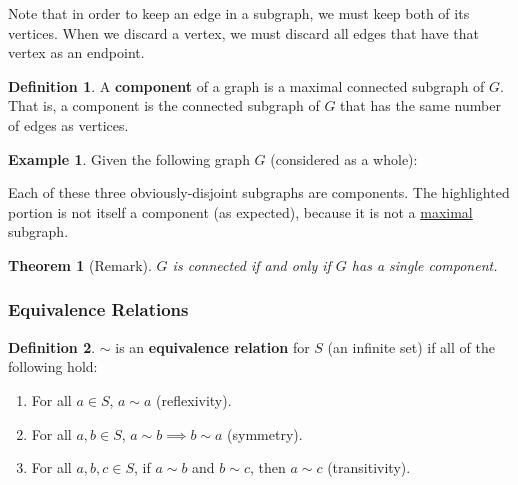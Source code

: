 \documentclass[]{article}
\newtheorem*{theorem}{Theorem}
\theoremstyle{definition}
\newtheorem*{defn}{Definition}
\newtheorem{ex}{Example}[section]
\begin{document}
				Note that in order to keep an edge in a subgraph, we must keep both of its vertices. When we discard a vertex, we must discard all edges that have that vertex as an endpoint.

				\begin{defn}
					A \textbf{component} of a graph is a maximal connected subgraph of $G$. That is, a component is the connected subgraph of $G$ that has the same number of edges as vertices.
				\end{defn}

				\begin{ex}
					Given the following graph $G$ (considered as a whole):
					\begin{center}
					\end{center}

					Each of these three obviously-disjoint subgraphs are components. The highlighted portion is not itself a component (as expected), because it is not a \underline{maximal} subgraph.
				\end{ex}

				\begin{theorem}[Remark]
					$G$ is connected if and only if $G$ has a single component.
				\end{theorem}

			\subsubsection{Equivalence Relations}
				\begin{defn}
					$\boldsymbol{\sim}$ is an \textbf{equivalence relation} for $S$ (an infinite set) if all of the following hold:
					\begin{enumerate}
						\item For all $a \in S$, $a \sim a$ (reflexivity).
						\item For all $a, b \in S$, $a \sim b \implies b \sim a$ (symmetry).
						\item For all $a, b, c \in S$, if $a \sim b$ and $b \sim c$, then $a \sim c$ (transitivity).
					\end{enumerate}
				\end{defn}
\end{document}
